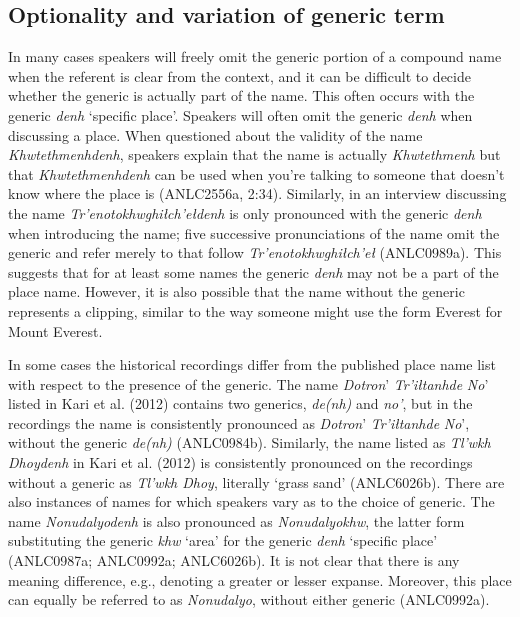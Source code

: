 \subsection{Optionality and variation of generic term}
In many cases speakers will freely omit the generic portion of a compound name when the referent is clear from the context, and it can be difficult to decide whether the generic is actually part of the name. This often occurs with the generic \textit{denh} ‘specific place’. Speakers will often omit the generic \textit{denh} when discussing a place. When questioned about the validity of the name \textit{Khwtethmenhdenh}, speakers explain that the name is actually \textit{Khwtethmenh} but that \textit{Khwtethmenhdenh} can be used when you’re talking to someone that doesn’t know where the place is (ANLC2556a, 2:34). Similarly, in an interview discussing the name \textit{Tr’enotokhwghiłch’ełdenh} is only pronounced with the generic \textit{denh} when introducing the name; five successive pronunciations of the name omit the generic and refer merely to that follow \textit{Tr’enotokhwghiłch’eł} (ANLC0989a). This suggests that for at least some names the generic \textit{denh} may not be a part of the place name. However, it is also possible that the name without the generic represents a clipping, similar to the way someone might use the form Everest for Mount Everest.

In some cases the historical recordings differ from the published place name list with respect to the presence of the generic. The name \textit{Dotron}’ \textit{Tr’iłtanhde} \textit{No}’ listed in Kari et al. (2012) contains two generics, \textit{de(nh)} and \textit{no’}, but in the recordings the name is consistently pronounced as \textit{Dotron}’ \textit{Tr’iłtanhde} \textit{No}’, without the generic \textit{de(nh)} (ANLC0984b)\textit{}. Similarly, the name listed as \textit{Tl’wkh Dhoydenh} in Kari et al. (2012) is consistently pronounced on the recordings without a generic as \textit{Tl’wkh Dhoy}, literally ‘grass sand’ (ANLC6026b).
There are also instances of names for which speakers vary as to the choice of generic. The name \textit{Nonudalyodenh} is also pronounced as \textit{Nonudalyokhw}, the latter form substituting the generic \textit{khw} ‘area’ for the generic \textit{denh} ‘specific place’ (ANLC0987a; ANLC0992a; ANLC6026b). It is not clear that there is any meaning difference, e.g., denoting a greater or lesser expanse. Moreover, this place can equally be referred to as \textit{Nonudalyo}, without either generic\textit{} (ANLC0992a).

